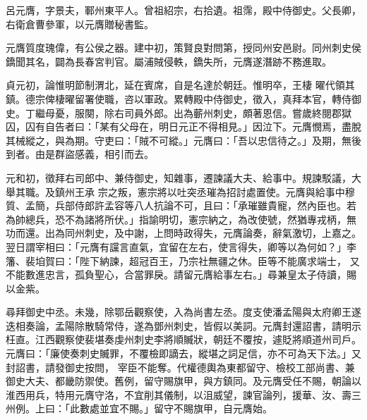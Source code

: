 \begin{pinyinscope}
 呂元膺，字景夫，鄆州東平人。曾祖紹宗，右拾遺。祖霈，殿中侍御史。父長卿，右衛倉曹參軍，以元膺贈秘書監。



 元膺質度瑰偉，有公侯之器。建中初，策賢良對問第，授同州安邑尉。同州刺史侯鐈聞其名，闢為長春宮判官。屬浦賊侵軼，鐈失所，元膺遂潛跡不務進取。



 貞元初，論惟明節制渭北，延在賓席，自是名達於朝廷。惟明卒，王棲
 曜代領其鎮。德宗俾棲曜留署使職，咨以軍政。累轉殿中侍御史，徵入，真拜本官，轉侍御史。丁繼母憂，服闋，除右司員外郎。出為蘄州刺史，頗著恩信。嘗歲終閱郡獄囚，囚有自告者曰：「某有父母在，明日元正不得相見。」因泣下。元膺憫焉，盡脫其械縱之，與為期。守吏曰：「賊不可縱。」元膺曰：「吾以忠信待之。」及期，無後到者。由是群盜感義，相引而去。



 元和初，徵拜右司郎中、兼侍御史，知雜事，遷諫議大夫、給事中。規諫駁議，大舉其職。及鎮州王承
 宗之叛，憲宗將以吐突丞璀為招討處置使。元膺與給事中穆質、孟簡，兵部侍郎許孟容等八人抗論不可，且曰：「承璀雖貴寵，然內臣也。若為帥總兵，恐不為諸將所伏。」指諭明切，憲宗納之，為改使號，然猶專戎柄，無功而還。出為同州刺史，及中謝，上問時政得失，元膺論奏，辭氣激切，上嘉之。翌日謂宰相曰：「元膺有讜言直氣，宜留在左右，使言得失，卿等以為何如？」李籓、裴垍賀曰：「陛下納諫，超冠百王，乃宗社無疆之休。臣等不能廣求端士，
 又不能數進忠言，孤負聖心，合當罪戾。請留元膺給事左右。」尋兼皇太子侍讀，賜以金紫。



 尋拜御史中丞。未幾，除鄂岳觀察使，入為尚書左丞。度支使潘孟陽與太府卿王遂迭相奏論，孟陽除散騎常侍，遂為鄧州刺史，皆假以美詞。元膺封還詔書，請明示枉直。江西觀察使裴堪奏虔州刺史李將順贓狀，朝廷不覆按，遽貶將順道州司戶。元膺曰：「廉使奏刺史贓罪，不覆檢即謫去，縱堪之詞足信，亦不可為天下法。」又封詔書，請發御史按問，
 宰臣不能奪。代權德輿為東都留守、檢校工部尚書、兼御史大夫、都畿防禦使。舊例，留守賜旗甲，與方鎮同。及元膺受任不賜，朝論以淮西用兵，特用元膺守洛，不宜削其儀制，以沮威望，諫官論列，援華、汝、壽三州例。上曰：「此數處並宜不賜。」留守不賜旗甲，自元膺始。




\end{pinyinscope}
